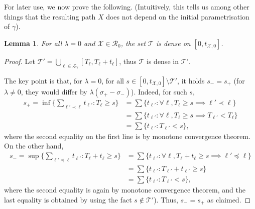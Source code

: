 \documentclass[11pt]{article}
\newtheorem{lemma}[theorem]{Lemma}
\def\Conf{{\mathscr{R}}}
\begin{document}
For later use, we now prove the following. (Intuitively, this tells us among other things that the resulting path $X$ does not depend on the initial parametrisation of $\gamma$). 

\begin{lemma}
  \label{le:dense}
  For all $\lambda=0$ and $\mathcal{X}\in \Conf_0$, the set $\mathcal{T}$ is dense on $[0,t_{\mathcal{X},0}]$.
\end{lemma}
\begin{proof}
  Let $\mathcal{T'}= \bigcup_{\ell\in \mathcal{L}_\gamma} [T_\ell,T_\ell+t_\ell]$, thus $\mathcal{T}$ is dense in $\mathcal{T}'$.

  The key point is that, for $\lambda=0$, for all $s\in [0,t_{\mathcal{X},0}] \setminus \mathcal{T}'$, it holds $s_-=s_+$ (for $\lambda\neq 0$, they would differ by $\lambda(\sigma_+-\sigma_-)$). Indeed, for such $s$,
  \begin{align*} s_+=\inf\{ \sum_{\ell'\prec \ell } t_{\ell'}: T_\ell\geq s\}
  &=\sum \{ t_{\ell'}: \forall \ell, T_\ell\geq s \implies \ell'\prec \ell\}\\
  &=\sum \{ t_{\ell'}: \forall \ell, T_\ell\geq s \implies T_{\ell'}< T_{\ell}\}\\
  &=\sum \{ t_{\ell'}:  T_{\ell'}< s \},
  \end{align*}
  where the second equality on the first line is by monotone convergence theorem.
  On the other hand,
  \begin{align*}
  s_-=\sup\{ \sum_{\ell'\preceq \ell } t_{\ell'}: T_\ell+t_\ell \geq s\}
  &=\sum \{ t_{\ell'}: \forall \ell, T_\ell+t_\ell \geq s \implies \ell'\preceq \ell\}\\
  &=\sum \{ t_{\ell'}:  T_{\ell'}+t_{\ell'}  \geq s \}\\
  &=\sum \{ t_{\ell'}:  T_{\ell'}< s \},
  \end{align*}
  where the second equality is again by monotone convergence theorem, and the last equality is obtained by using the fact $s\notin \mathcal{T}'$). Thus, $s_-=s_+$ as claimed.


\end{proof}
\end{document}

